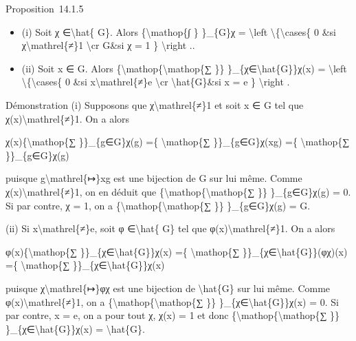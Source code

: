 \documentclass[]{article}
\begin{document}
Proposition~14.1.5

\begin{itemize}
\itemsep1pt\parskip0pt
\item
  (i) Soit χ ∈\textbackslash{}hat\{ G\}. Alors
  \{\textbackslash{}mathop\{∫ \} \}\_\{G\}χ = \textbackslash{}left
  \textbackslash{}\{\textbackslash{}cases\{ 0 \&si
  χ\textbackslash{}mathrel\{≠\}1 \textbackslash{}cr
  \textbar{}G\textbar{}\&si χ = 1 \} \textbackslash{}right ..
\item
  (ii) Soit x ∈ G. Alors
  \{\textbackslash{}mathop\{\textbackslash{}mathop\{∑ \}\}
  \}\_\{χ∈\textbackslash{}hat\{G\}\}χ(x) = \textbackslash{}left
  \textbackslash{}\{\textbackslash{}cases\{ 0 \&si
  x\textbackslash{}mathrel\{≠\}e \textbackslash{}cr
  \textbar{}\textbackslash{}hat\{G\}\textbar{}\&si x = e \}
  \textbackslash{}right .
\end{itemize}

Démonstration (i) Supposons que χ\textbackslash{}mathrel\{≠\}1 et soit x
∈ G tel que χ(x)\textbackslash{}mathrel\{≠\}1. On a alors

χ(x)\{\textbackslash{}mathop\{∑ \}\}\_\{g∈G\}χ(g) =\{
\textbackslash{}mathop\{∑ \}\}\_\{g∈G\}χ(xg) =\{
\textbackslash{}mathop\{∑ \}\}\_\{g∈G\}χ(g)

puisque g\textbackslash{}mathrel\{↦\}xg est une bijection de G sur lui
même. Comme χ(x)\textbackslash{}mathrel\{≠\}1, on en déduit que
\{\textbackslash{}mathop\{\textbackslash{}mathop\{∑ \}\} \}\_\{g∈G\}χ(g)
= 0. Si par contre, χ = 1, on a
\{\textbackslash{}mathop\{\textbackslash{}mathop\{∑ \}\} \}\_\{g∈G\}χ(g)
= \textbar{}G\textbar{}.

(ii) Si x\textbackslash{}mathrel\{≠\}e, soit φ ∈\textbackslash{}hat\{
G\} tel que φ(x)\textbackslash{}mathrel\{≠\}1. On a alors

φ(x)\{\textbackslash{}mathop\{∑ \}\}\_\{χ∈\textbackslash{}hat\{G\}\}χ(x)
=\{ \textbackslash{}mathop\{∑
\}\}\_\{χ∈\textbackslash{}hat\{G\}\}(φχ)(x) =\{
\textbackslash{}mathop\{∑ \}\}\_\{χ∈\textbackslash{}hat\{G\}\}χ(x)

puisque χ\textbackslash{}mathrel\{↦\}φχ est une bijection de
\textbackslash{}hat\{G\} sur lui même. Comme
φ(x)\textbackslash{}mathrel\{≠\}1, on a
\{\textbackslash{}mathop\{\textbackslash{}mathop\{∑ \}\}
\}\_\{χ∈\textbackslash{}hat\{G\}\}χ(x) = 0. Si par contre, x = e, on a
pour tout χ, χ(x) = 1 et donc
\{\textbackslash{}mathop\{\textbackslash{}mathop\{∑ \}\}
\}\_\{χ∈\textbackslash{}hat\{G\}\}χ(x) =
\textbar{}\textbackslash{}hat\{G\}\textbar{}.
\end{document}
